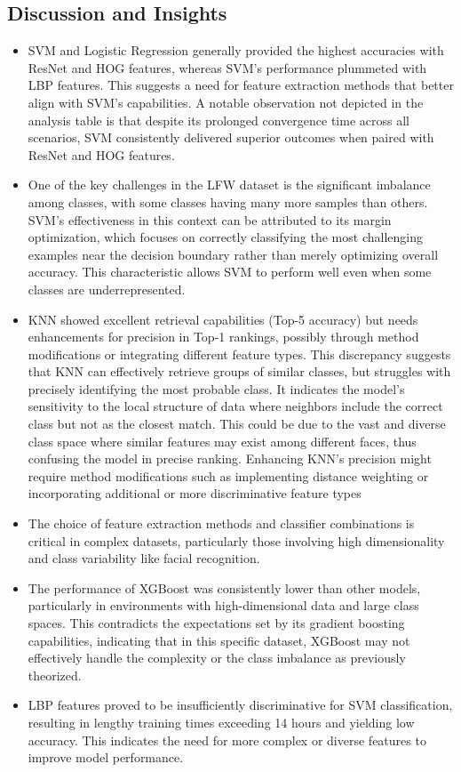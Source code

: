 \documentclass[a4paper]{article}
\theoremstyle{plain}
\theoremstyle{definition}
\begin{document}
\subsection{Discussion and Insights}
\begin{itemize}
    \item SVM and Logistic Regression generally provided the highest accuracies with ResNet and HOG features, whereas SVM's performance plummeted with LBP features. This suggests a need for feature extraction methods that better align with SVM’s capabilities. A notable observation not depicted in the analysis table is that despite its prolonged convergence time across all scenarios, SVM consistently delivered superior outcomes when paired with ResNet and HOG features.


\item One of the key challenges in the LFW dataset is the significant imbalance among classes, with some classes having many more samples than others. SVM's effectiveness in this context can be attributed to its margin optimization, which focuses on correctly classifying the most challenging examples near the decision boundary rather than merely optimizing overall accuracy. This characteristic allows SVM to perform well even when some classes are underrepresented.

    \item KNN showed excellent retrieval capabilities (Top-5 accuracy) but needs enhancements for precision in Top-1 rankings, possibly through method modifications or integrating different feature types. This discrepancy suggests that KNN can effectively retrieve groups of similar classes, but struggles with precisely identifying the most probable class. It indicates the model's sensitivity to the local structure of data where neighbors include the correct class but not as the closest match. This could be due to the vast and diverse class space where similar features may exist among different faces, thus confusing the model in precise ranking. Enhancing KNN's precision might require method modifications such as implementing distance weighting or incorporating additional or more discriminative feature types
    \item The choice of feature extraction methods and classifier combinations is critical in complex datasets, particularly those involving high dimensionality and class variability like facial recognition.
        \item The performance of XGBoost was consistently lower than other models, particularly in environments with high-dimensional data and large class spaces. This contradicts the expectations set by its gradient boosting capabilities, indicating that in this specific dataset, XGBoost may not effectively handle the complexity or the class imbalance as previously theorized.
     \item 
LBP features proved to be insufficiently discriminative for SVM classification, resulting in lengthy training times exceeding 14 hours and yielding low accuracy. This indicates the need for more complex or diverse features to improve model performance.
\end{itemize}
\end{document}
